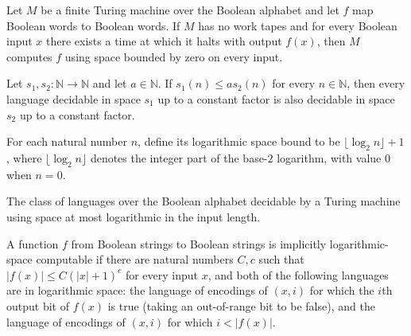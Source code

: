 \begin{theorem}
\label{Turing.FinTM.computesInSpace_zero_of_k_eq_zero}
\leanok
{}
Let $M$ be a finite Turing machine over the Boolean alphabet and let $f$ map Boolean
words to Boolean words. If $M$ has no work tapes and for every Boolean input $x$ there
exists a time at which it halts with output $f(x)$, then $M$ computes $f$ using space
bounded by zero on every input.
\end{theorem}

\begin{theorem}
\label{Complexity.SPACE.mono_const}
\leanok
{}
Let $s_1,s_2:\mathbb{N}\to\mathbb{N}$ and let $a\in\mathbb{N}$. If $s_1(n)\le a s_2(n)$
for every $n\in\mathbb{N}$, then every language decidable in space $s_1$ up to a
constant factor is also decidable in space $s_2$ up to a constant factor.
\end{theorem}

\begin{definition}
\label{Complexity.logSpace}
\leanok
For each natural number $n$, define its logarithmic space bound to be
$\lfloor\log_2 n\rfloor+1$, where $\lfloor\log_2 n\rfloor$ denotes the integer part of
the base-$2$ logarithm, with value $0$ when $n=0$.
\end{definition}

\begin{definition}
\label{Complexity.LOGSPACE}
\leanok
{}
The class of languages over the Boolean alphabet decidable by a Turing machine using
space at most logarithmic in the input length.
\end{definition}

\begin{definition}
\label{Complexity.ImplicitlyLogspaceComputable}
\leanok
{}
A function $f$ from Boolean strings to Boolean strings is implicitly logarithmic-space
computable if there are natural numbers $C,c$ such that $|f(x)|\le C(|x|+1)^c$ for every
input $x$, and both of the following languages are in logarithmic space: the language of
encodings of $(x,i)$ for which the $i$th output bit of $f(x)$ is true (taking an
out-of-range bit to be false), and the language of encodings of $(x,i)$ for which
$i<|f(x)|$.
\end{definition}

